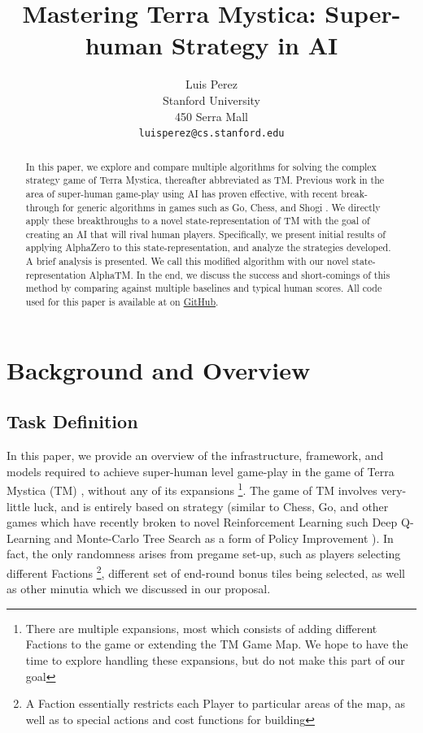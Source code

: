 \documentclass[10pt,twocolumn,letterpaper]{article}
\begin{document}
\title{Mastering Terra Mystica: Super-human Strategy in AI}

\author{
Luis Perez\\
Stanford University\\
450 Serra Mall\\
{\tt\small luisperez@cs.stanford.edu}
}

\maketitle
\thispagestyle{empty}

\begin{abstract}
In this paper, we explore and compare multiple algorithms for solving the complex strategy game of Terra Mystica, thereafter abbreviated as TM. Previous work in the area of super-human game-play using AI has proven effective, with recent break-through for generic algorithms in games such as Go, Chess, and Shogi \cite{AlphaZero}. We directly apply these breakthroughs to a novel state-representation of TM with the goal of creating an AI that will rival human players. Specifically, we present initial results of applying AlphaZero to this state-representation, and analyze the strategies developed. A brief analysis is presented. We call this modified algorithm with our novel state-representation AlphaTM. In the end, we discuss the success and short-comings of this method by comparing against multiple baselines and typical human scores. All code used for this paper is available at on \href{https://github.com/kandluis/terrazero}{GitHub}.

\end{abstract}

\section{Background and Overview}
\label{section:background_and_overview}
\subsection{Task Definition}
\label{section:task_definition}
In this paper, we provide an overview of the infrastructure, framework, and models required to achieve super-human level game-play in the game of Terra Mystica (TM) \cite{TMBoardGeek}, without any of its expansions \footnote{There are multiple expansions, most which consists of adding different Factions to the game or extending the TM Game Map. We hope to have the time to explore handling these expansions, but do not make this part of our goal}. The game of TM involves very-little luck, and is entirely based on strategy (similar to Chess, Go, and other games which have recently broken to novel Reinforcement Learning such Deep Q-Learning and Monte-Carlo Tree Search as a form of Policy Improvement \cite{AlphaGo} \cite{AlphaGoZero}). In fact, the only randomness arises from pregame set-up, such as players selecting different Factions \footnote{A Faction essentially restricts each Player to particular areas of the map, as well as to special actions and cost functions for building}, different set of end-round bonus tiles being selected, as well as other minutia which we discussed in our proposal.
\end{document}

